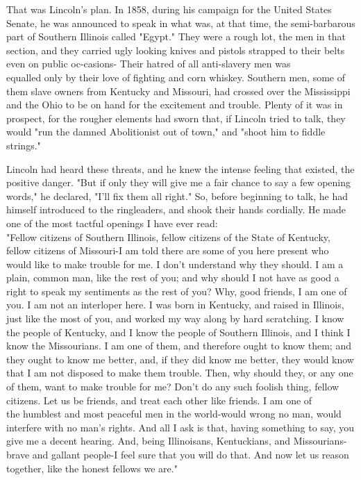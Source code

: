\documentclass[10pt]{article}
\begin{document}
That was Lincoln's plan. In 1858, during his campaign for the United States Senate, he was announced to speak in what was, at that time, the semi-barbarous part of Southern Illinois called "Egypt." They were a rough lot, the men in that section, and they carried ugly looking knives and pistols strapped to their belts even on public oc-casions- Their hatred of all anti-slavery men was\\
equalled only by their love of fighting and corn whiskey. Southern men, some of them slave owners from Kentucky and Missouri, had crossed over the Mississippi and the Ohio to be on hand for the excitement and trouble. Plenty of it was in prospect, for the rougher elements had sworn that, if Lincoln tried to talk, they would "run the damned Abolitionist out of town," and "shoot him to fiddle strings."

Lincoln had heard these threats, and he knew the intense feeling that existed, the positive danger. "But if only they will give me a fair chance to say a few opening words," he declared, "I'll fix them all right." So, before beginning to talk, he had himself introduced to the ringleaders, and shook their hands cordially. He made one of the most tactful openings I have ever read:\\
"Fellow citizens of Southern Illinois, fellow citizens of the State of Kentucky, fellow citizens of Missouri-I am told there are some of you here present who would like to make trouble for me. I don't understand why they should. I am a plain, common man, like the rest of you; and why should I not have as good a right to speak my sentiments as the rest of you? Why, good friends, I am one of you. I am not an interloper here. I was born in Kentucky, and raised in Illinois, just like the most of you, and worked my way along by hard scratching. I know the people of Kentucky, and I know the people of Southern Illinois, and I think I know the Missourians. I am one of them, and therefore ought to know them; and they ought to know me better, and, if they did know me better, they would know that I am not disposed to make them trouble. Then, why should they, or any one of them, want to make trouble for me? Don't do any such foolish thing, fellow citizens. Let us be friends, and treat each other like friends. I am one of\\
the humblest and most peaceful men in the world-would wrong no man, would interfere with no man's rights. And all I ask is that, having something to say, you give me a decent hearing. And, being Illinoisans, Kentuckians, and Missourians-brave and gallant people-I feel sure that you will do that. And now let us reason together, like the honest fellows we are."
\end{document}
